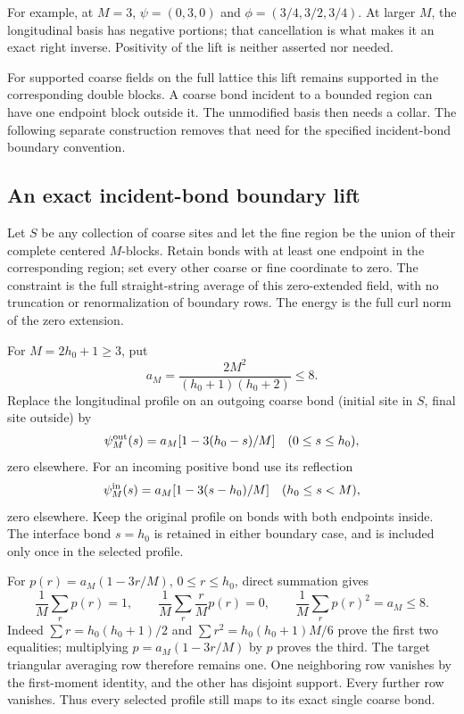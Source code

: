 \documentclass[11pt]{article}
\theoremstyle{remark}
\begin{document}
For example, at $M=3$, $\psi=(0,3,0)$ and
$\phi=(3/4,3/2,3/4)$. At larger $M$, the longitudinal basis has
negative portions; that cancellation is what makes it an exact
right inverse. Positivity of the lift is neither asserted nor needed.

For supported coarse fields on the full lattice this lift remains
supported in the corresponding double blocks. A coarse bond incident
to a bounded region can have one endpoint block outside it. The
unmodified basis then needs a collar. The following separate
construction removes that need for the specified incident-bond
boundary convention.

\subsection{An exact incident-bond boundary lift}

Let $S$ be any collection of coarse sites and let the fine region
be the union of their complete centered $M$-blocks. Retain bonds
with at least one endpoint in the corresponding region; set every
other coarse or fine coordinate to zero. The constraint is the
full straight-string average of this zero-extended field, with no
truncation or renormalization of boundary rows. The energy is the
full curl norm of the zero extension.

For $M=2h_0+1\ge3$, put
\[
 a_M=\frac{2M^2}{(h_0+1)(h_0+2)}\le8.
\]
Replace the longitudinal profile on an outgoing coarse bond (initial
site in $S$, final site outside) by
\[
 \psi_M^{\rm out}(s)=a_M[1-3(h_0-s)/M]
       \quad(0\le s\le h_0),
\]
zero elsewhere. For an incoming positive bond use its reflection
\[
 \psi_M^{\rm in}(s)=a_M[1-3(s-h_0)/M]
       \quad(h_0\le s<M),
\]
zero elsewhere. Keep the original profile on bonds with both endpoints
inside. The interface bond $s=h_0$ is retained in either boundary
case, and is included only once in the selected profile.

For $p(r)=a_M(1-3r/M)$, $0\le r\le h_0$, direct summation gives
\[
 \frac1M\sum_rp(r)=1,\qquad
 \frac1M\sum_r\frac rM p(r)=0,\qquad
 \frac1M\sum_rp(r)^2=a_M\le8.
\]
Indeed $\sum r=h_0(h_0+1)/2$ and
$\sum r^2=h_0(h_0+1)M/6$ prove the first two equalities;
multiplying $p=a_M(1-3r/M)$ by $p$ proves the third.
The target triangular averaging row therefore remains one. One
neighboring row vanishes by the first-moment identity, and the other
has disjoint support. Every further row vanishes. Thus every selected
profile still maps to its exact single coarse bond.
\end{document}
